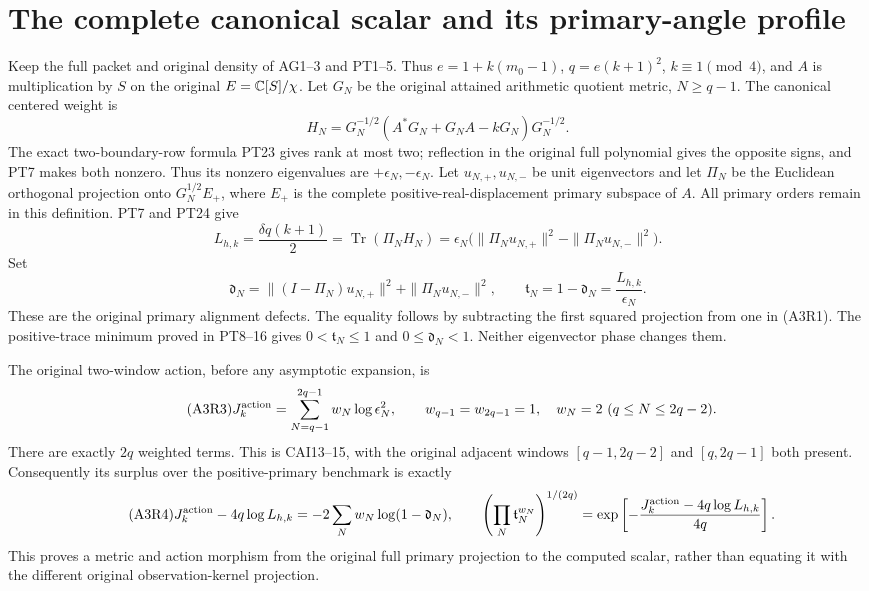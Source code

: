 \documentclass[11pt,a4paper]{article}
\providecommand{\Tr}{\operatorname{Tr}}
\begin{document}
\section{The complete canonical scalar and its primary-angle profile}
Keep the full packet and original density of AG1--3 and PT1--5.
Thus $e=1+k(m_0-1)$, $q=e(k+1)^2$, $k\equiv1\pmod4$,
and $A$ is multiplication by $S$ on the original $E=\mathbb C[S]/\chi$.
Let $G_N$ be the original attained arithmetic quotient metric, $N\ge q-1$.
The canonical centered weight is
\[
 H_N=G_N^{-1/2}(A^*G_N+G_NA-kG_N)G_N^{-1/2}.
\]
The exact two-boundary-row formula PT23 gives rank at most two;
reflection in the original full polynomial gives the opposite signs,
and PT7 makes both nonzero. Thus its nonzero eigenvalues are
$+\epsilon_N,-\epsilon_N$. Let $u_{N,+},u_{N,-}$ be
unit eigenvectors and let $\Pi_N$ be the Euclidean orthogonal projection onto
$G_N^{1/2}E_+$, where $E_+$ is the complete positive-real-displacement
primary subspace of $A$. All primary orders remain in this definition.
PT7 and PT24 give
\begin{equation}\tag{A3R1}
 L_{h,k}=\frac{\delta q(k+1)}2
 =\Tr(\Pi_NH_N)
 =\epsilon_N\bigl(\|\Pi_Nu_{N,+}\|^2-\|\Pi_Nu_{N,-}\|^2\bigr).
\end{equation}
Set
\begin{equation}\tag{A3R2}
 \mathfrak d_N=\|(I-\Pi_N)u_{N,+}\|^2+\|\Pi_Nu_{N,-}\|^2,
 \qquad \mathfrak t_N=1-\mathfrak d_N=\frac{L_{h,k}}{\epsilon_N}.
\end{equation}
These are the original primary alignment defects. The equality follows
by subtracting the first squared projection from one in (A3R1).
The positive-trace minimum proved in PT8--16 gives
$0<\mathfrak t_N\le1$ and $0\le \mathfrak d_N<1$. Neither eigenvector phase changes them.

The original two-window action, before any asymptotic expansion, is
\begin{equation}\tag{A3R3}
 J_k^{\rm action}=\sum_{N=q-1}^{2q-1}w_N\log\epsilon_N^2,
 \qquad w_{q-1}=w_{2q-1}=1,\quad w_N=2\ (q\le N\le2q-2).
\end{equation}
There are exactly $2q$ weighted terms. This is CAI13--15, with the
original adjacent windows $[q-1,2q-2]$ and $[q,2q-1]$ both present.
Consequently its surplus over the positive-primary benchmark is exactly
\begin{equation}\tag{A3R4}
 J_k^{\rm action}-4q\log L_{h,k}
 =-2\sum_Nw_N\log(1-\mathfrak d_N),\qquad
 \left(\prod_N\mathfrak t_N^{w_N}\right)^{1/(2q)}
 =\exp\left[-\frac{J_k^{\rm action}-4q\log L_{h,k}}{4q}\right].
\end{equation}
This proves a metric and action morphism from the original full primary
projection to the computed scalar, rather than equating it with the
different original observation-kernel projection.
\end{document}
